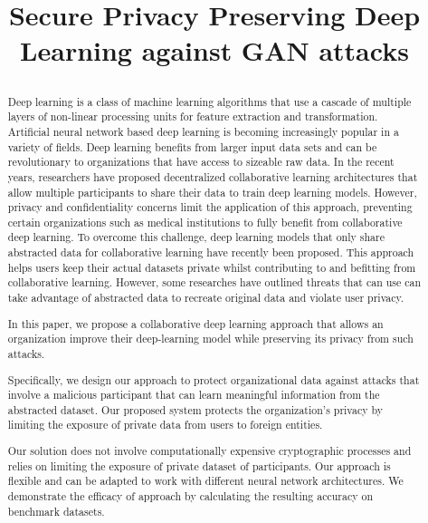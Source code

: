 \documentclass[conference]{IEEEtran}
\begin{document}
\title{{Secure Privacy Preserving Deep Learning against GAN attacks}\\
\author{
\and
{}
}
}
\maketitle

\begin{abstract} 
Deep learning is a class of machine learning algorithms that use a cascade of multiple layers of non-linear processing units for feature
extraction and transformation. Artificial neural network based
deep learning is becoming increasingly popular in a variety of fields. Deep learning benefits from larger input data sets and can be
revolutionary to organizations that have access to sizeable raw data. In
the recent years,  researchers have proposed decentralized collaborative learning architectures that allow multiple participants to share their data to train deep learning models. However, privacy and confidentiality concerns limit the application of this approach, preventing certain organizations such as medical institutions to fully benefit from collaborative deep
learning. 
To overcome this challenge, deep learning models that only share abstracted data for collaborative learning have recently been proposed. This approach helps users keep their actual datasets private whilst contributing to and befitting from collaborative learning. However, some researches have outlined threats that can use can take advantage of abstracted data to recreate original data and violate user privacy.

In this paper, we propose a collaborative deep learning approach that allows an organization improve their deep-learning model while preserving its privacy from such attacks. 

Specifically, we design our approach to protect organizational data against attacks that involve a malicious participant that can learn meaningful information from the abstracted dataset. Our proposed system protects the organization's privacy by limiting the exposure of private data from users to foreign entities. 


Our solution does not involve computationally expensive cryptographic processes and relies on limiting the exposure of private dataset of participants. 
Our approach is flexible and can be adapted to work with different neural network architectures. We demonstrate the efficacy of approach by calculating the resulting accuracy on benchmark datasets.
\end{abstract}
\end{document}

